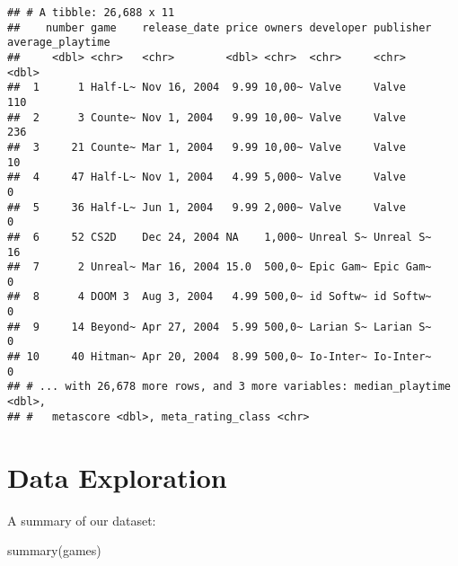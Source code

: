 \documentclass[
]{article}
\newenvironment{Shaded}{\begin{snugshade}}{\end{snugshade}}
\newcommand{\FunctionTok}[1]{\textcolor[rgb]{0.00,0.00,0.00}{#1}}
\newcommand{\NormalTok}[1]{#1}
\begin{document}
\begin{verbatim}
## # A tibble: 26,688 x 11
##    number game    release_date price owners developer publisher average_playtime
##     <dbl> <chr>   <chr>        <dbl> <chr>  <chr>     <chr>                <dbl>
##  1      1 Half-L~ Nov 16, 2004  9.99 10,00~ Valve     Valve                  110
##  2      3 Counte~ Nov 1, 2004   9.99 10,00~ Valve     Valve                  236
##  3     21 Counte~ Mar 1, 2004   9.99 10,00~ Valve     Valve                   10
##  4     47 Half-L~ Nov 1, 2004   4.99 5,000~ Valve     Valve                    0
##  5     36 Half-L~ Jun 1, 2004   9.99 2,000~ Valve     Valve                    0
##  6     52 CS2D    Dec 24, 2004 NA    1,000~ Unreal S~ Unreal S~               16
##  7      2 Unreal~ Mar 16, 2004 15.0  500,0~ Epic Gam~ Epic Gam~                0
##  8      4 DOOM 3  Aug 3, 2004   4.99 500,0~ id Softw~ id Softw~                0
##  9     14 Beyond~ Apr 27, 2004  5.99 500,0~ Larian S~ Larian S~                0
## 10     40 Hitman~ Apr 20, 2004  8.99 500,0~ Io-Inter~ Io-Inter~                0
## # ... with 26,678 more rows, and 3 more variables: median_playtime <dbl>,
## #   metascore <dbl>, meta_rating_class <chr>
\end{verbatim}

\hypertarget{data-exploration}{%
\section{Data Exploration}\label{data-exploration}}

A summary of our dataset:

\begin{Shaded}
\begin{Highlighting}[]
\FunctionTok{summary}\NormalTok{(games)}
\end{Highlighting}
\end{Shaded}
\end{document}
